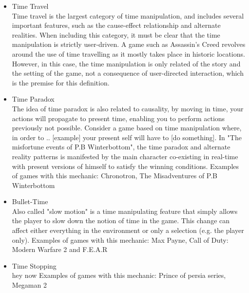 \begin{itemize}
\item{Time Travel} \\ Time travel is the largest category of time manipulation, and includes several important features, 
such as the cause-effect relationship and alternate realities. When including this category, it must be clear that the time manipulation is strictly user-driven. 
A game such as Assassin's Creed revolves around the use of time travelling as it mostly takes place in historic locations. However, in this case, the
 time manipulation is only related of the story and the setting of the game, not a consequence of user-directed interaction, which is the premise for this definition. 

\item{Time Paradox} \\ The idea of time paradox is also related to causality, by moving in time, your actions will propagate to present time,
 enabling you to perform actions previously not possible. Consider a game based on time manipulation where, in order to .. [example] 
your present self will have to [do something]. In "The misfortune events of P.B Winterbottom", the time paradox and alternate reality 
patterns is manifested by the main character co-existing in real-time with present versions of himself to satisfy the winning conditions. 
Examples of games with this mechanic: Chronotron, The Misadventures of P.B Winterbottom

\item{Bullet-Time} \\ Also called "slow motion" is a time manipulating feature that simply allows the player to slow down the notion of time in the game. 
This change can affect either everything in the environment or only a selection (e.g. the player only). 
Examples of games with this mechanic: Max Payne, Call of Duty: Modern Warfare 2 and F.E.A.R

\item{Time Stopping} \\ hey now
Examples of games with this mechanic: Prince of persia series, Megaman 2
\end{itemize}
